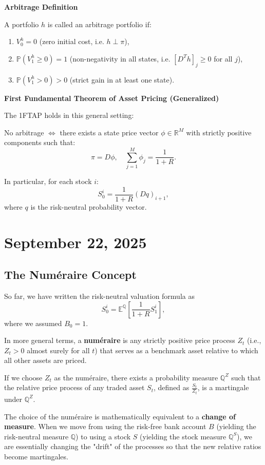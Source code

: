 \documentclass[12pt,a4paper]{article}
\theoremstyle{definition}
\newcommand{\R}{\mathbb{R}}
\newcommand{\Q}{\mathbb{Q}}
\newcommand{\E}{\mathbb{E}}
\newcommand{\Prob}{\mathbb{P}}
\begin{document}
\textbf{Arbitrage Definition}

A portfolio $h$ is called an arbitrage portfolio if:
\begin{enumerate}
\item $V_0^h = 0$ (zero initial cost, i.e. $h \perp \pi$),
\item $\Prob(V_1^h \geq 0) = 1$ (non-negativity in all states, i.e. $[D^T h]_j \geq 0$ for all $j$),
\item $\Prob(V_1^h > 0) > 0$ (strict gain in at least one state).
\end{enumerate}

\textbf{First Fundamental Theorem of Asset Pricing (Generalized)}

The 1FTAP holds in this general setting:

No arbitrage $\Leftrightarrow$ there exists a state price vector $\phi \in \R^M$ with strictly positive components such that:
\[
\pi = D\phi, \quad \sum_{j=1}^M \phi_j = \frac{1}{1+R}.
\]

In particular, for each stock $i$:
\[
S_0^i = \frac{1}{1+R} (Dq)_{i+1},
\]
where $q$ is the risk-neutral probability vector.

\newpage
\section{September 22, 2025}

\subsection{The Numéraire Concept}

So far, we have written the risk-neutral valuation formula as
\[
S_0^i = \E^\Q\left[\frac{1}{1+R}S_1^i\right],
\]
where we assumed $B_0 = 1$.

In more general terms, a \textbf{numéraire} is any strictly positive price process $Z_t$ (i.e., $Z_t > 0$ almost surely for all $t$) that serves as a benchmark asset relative to which all other assets are priced.

If we choose $Z_t$ as the numéraire, there exists a probability measure $\Q^Z$ such that the relative price process of any traded asset $S_t$, defined as $\frac{S_t}{Z_t}$, is a martingale under $\Q^Z$.

The choice of the numéraire is mathematically equivalent to a \textbf{change of measure}. When we move from using the risk-free bank account $B$ (yielding the risk-neutral measure $\Q$) to using a stock $S$ (yielding the stock measure $\Q^S$), we are essentially changing the "drift" of the processes so that the new relative ratios become martingales.
\end{document}
